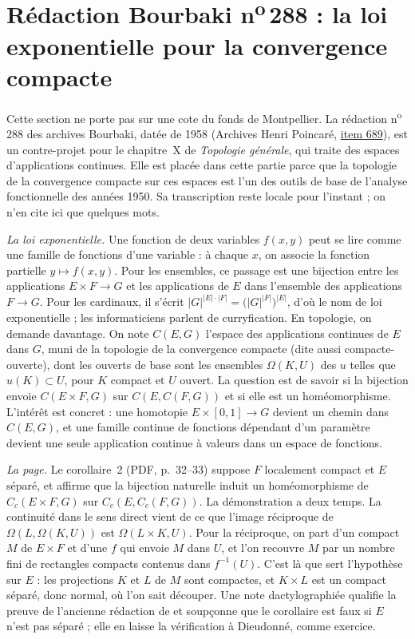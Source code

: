 \section[Rédaction Bourbaki n\textsuperscript{o}\,288 : la loi exponentielle]{Rédaction Bourbaki n\textsuperscript{o}\,288 : la loi exponentielle pour la convergence compacte\protect{}}\label{sec:bourbaki-288}

Cette section ne porte pas sur une cote du fonds de Montpellier. La rédaction n\textsuperscript{o}\,288 des archives Bourbaki, datée de 1958 (Archives Henri Poincaré, \href{https://archives-bourbaki.ahp-numerique.fr/items/show/689}{item 689}), est un contre-projet pour le chapitre~X de \emph{Topologie générale}, qui traite des espaces d'applications continues. Elle est placée dans cette partie parce que la topologie de la convergence compacte sur ces espaces est l'un des outils de base de l'analyse fonctionnelle des années 1950. Sa transcription reste locale pour l'instant ; on n'en cite ici que quelques mots.

\emph{La loi exponentielle.} Une fonction de deux variables $f(x, y)$ peut se lire comme une famille de fonctions d'une variable : à chaque $x$, on associe la fonction partielle $y \mapsto f(x, y)$. Pour les ensembles, ce passage est une bijection entre les applications $E \times F \to G$ et les applications de $E$ dans l'ensemble des applications $F \to G$. Pour les cardinaux, il s'écrit $|G|^{|E|\cdot|F|} = \bigl(|G|^{|F|}\bigr)^{|E|}$, d'où le nom de loi exponentielle ; les informaticiens parlent de curryfication. En topologie, on demande davantage. On note $C(E, G)$ l'espace des applications continues de $E$ dans $G$, muni de la topologie de la convergence compacte (dite aussi compacte-ouverte), dont les ouverts de base sont les ensembles $\Omega(K, U)$ des $u$ telles que $u(K) \subset U$, pour $K$ compact et $U$ ouvert. La question est de savoir si la bijection envoie $C(E \times F, G)$ sur $C(E, C(F, G))$ et si elle est un homéomorphisme. L'intérêt est concret : une homotopie $E \times [0, 1] \to G$ devient un chemin dans $C(E, G)$, et une famille continue de fonctions dépendant d'un paramètre devient une seule application continue à valeurs dans un espace de fonctions.

\emph{La page.} Le corollaire~2 (PDF, p.~32--33) suppose $F$ localement compact et $E$ séparé, et affirme que la bijection naturelle induit un homéomorphisme de $C_c(E \times F, G)$ sur $C_c(E, C_c(F, G))$. La démonstration a deux temps. La continuité dans le sens direct vient de ce que l'image réciproque de $\Omega(L, \Omega(K, U))$ est $\Omega(L \times K, U)$. Pour la réciproque, on part d'un compact $M$ de $E \times F$ et d'une $f$ qui envoie $M$ dans $U$, et l'on recouvre $M$ par un nombre fini de rectangles compacts contenus dans $f^{-1}(U)$. C'est là que sert l'hypothèse sur $E$ : les projections $K$ et $L$ de $M$ sont compactes, et $K \times L$ est un compact séparé, donc normal, où l'on sait découper. Une note dactylographiée qualifie la preuve de l'ancienne rédaction de  et soupçonne que le corollaire est faux si $E$ n'est pas séparé ; elle en laisse la vérification à Dieudonné, comme exercice.

